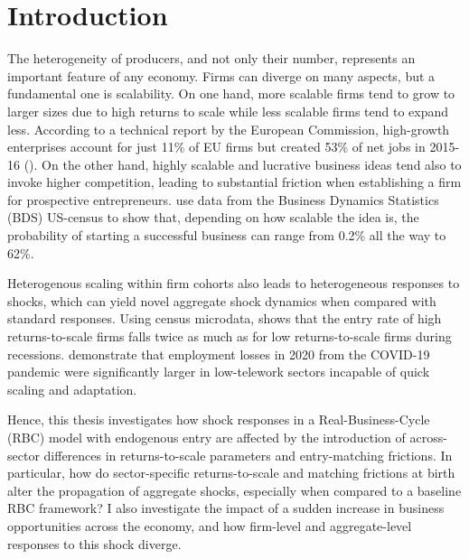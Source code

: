 \documentclass[a4paper,12pt]{article} %
\numberwithin{equation}{section} %
\numberwithin{figure}{section}
\numberwithin{table}{section}
\begin{document}
\newpage
{} %
\pagestyle{fancy}
\fancyhf{}
\fancyhead[C]{\leftmark}
\fancyfoot[C]{\thepage}

\thispagestyle{plain}
\section{Introduction}
\label{sec:introduction}

The heterogeneity of producers, and not only their number, represents an important feature of any economy. Firms can diverge on many aspects,
but a fundamental one is scalability. On one hand, more scalable firms tend to grow to larger sizes due to high returns to scale while less scalable firms tend
to expand less. According to a technical report by the European Commission, high-growth enterprises account for just 11\% of EU firms but created 53\% 
of net jobs in 2015-16 (\cite{flachenecker2020highgrowth}).
On the other hand, highly scalable and lucrative business ideas tend also to invoke higher competition, leading to
substantial friction when establishing a firm for prospective entrepreneurs. \textcite{sedlavcek2017growth} use data from the 
Business Dynamics Statistics (BDS) US-census to show that, depending on how scalable the idea is, the probability of 
starting a successful business can range from 0.2\% all the way to 62\%.

Heterogenous scaling within firm cohorts also leads to heterogeneous responses to shocks, which can yield novel aggregate shock dynamics when compared
with standard responses. Using census microdata, \textcite{smirnyagin2023returns} shows that the entry rate of high returns-to-scale firms falls 
twice as much as for low returns-to-scale firms during recessions. \textcite{calligaris2023employment} demonstrate that employment losses in 2020 from the COVID-19
pandemic were significantly larger in low-telework sectors incapable of quick scaling and adaptation.

Hence, this thesis investigates how shock responses in a Real-Business-Cycle (RBC) model with endogenous entry are affected by the introduction of across-sector 
differences in returns-to-scale parameters and entry-matching frictions. In particular, how do sector-specific returns-to-scale and matching frictions at birth 
alter the propagation of aggregate shocks, especially when compared to a baseline RBC framework? I also investigate the impact of a sudden increase in business 
opportunities across the economy, and how firm-level and aggregate-level responses to this shock diverge.
\end{document}
